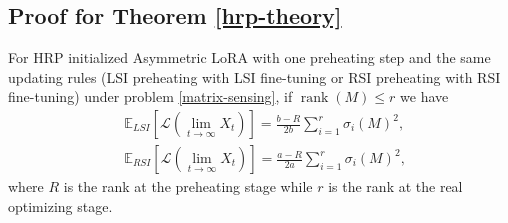\subsection{Proof for Theorem \ref{hrp-theory}}
\label{hrp-theory-proof}
\begin{theorem}
    For HRP initialized Asymmetric LoRA with one preheating step and the same updating rules (LSI preheating with LSI fine-tuning or RSI preheating with RSI fine-tuning) under problem \ref{matrix-sensing}, if $\operatorname{rank}(M)\leq r$ we have
    \begin{align*}
        &\mathbb{E}_{LSI}\left[\mathcal{L}(\lim_{t\to\infty}X_t)\right]=\frac{b-R}{2b}\sum_{i=1}^r\sigma_i(M)^2,\\
        &\mathbb{E}_{RSI}\left[\mathcal{L}(\lim_{t\to\infty}X_t)\right]=\frac{a-R}{2a}\sum_{i=1}^r\sigma_i(M)^2,
    \end{align*}
    where $R$ is the rank at the preheating stage while $r$ is the rank at the real optimizing stage. 
\end{theorem}
